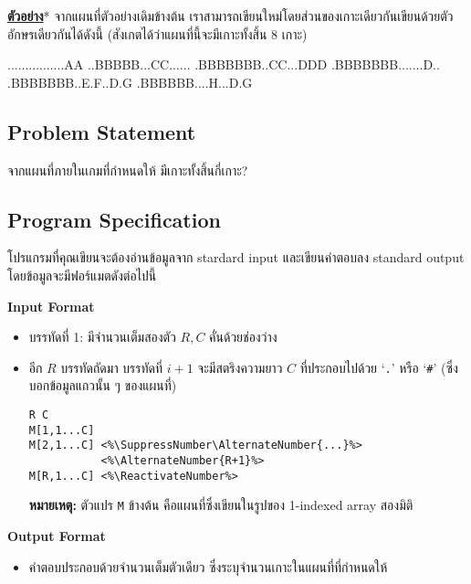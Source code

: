 \bigskip\noindent
\textbf{\uline{ตัวอย่าง}}* จากแผนที่ตัวอย่างเดิมข้างต้น 
เราสามารถเขียนใหม่โดยส่วนของเกาะเดียวกันเขียนด้วยตัวอักษรเดียวกันได้ดังนี้
(สังเกตได้ว่าแผนที่นี้จะมีเกาะทั้งสิ้น 8 เกาะ)
\begin{center}
    \vspace{0.25\baselineskip}
    \begin{centervrb}{18}
\begin{plainvrb}
................AA
..BBBBB...CC......
.BBBBBBB..CC...DDD
.BBBBBBB.......D..
.BBBBBBB..E.F..D.G
.BBBBBB....H...D.G
\end{plainvrb}
    \end{centervrb}
    \vspace{0.25\baselineskip}
\end{center}    

\subsection*{\sectionfont\upshape Problem Statement}

จากแผนที่ภายในเกมที่กำหนดให้ มีเกาะทั้งสิ้นกี่เกาะ?

\subsection*{\sectionfont\upshape Program Specification}

โปรแกรมที่คุณเขียนจะต้องอ่านข้อมูลจาก stardard input 
และเขียนคำตอบลง standard output โดยข้อมูลจะมีฟอร์แมตดังต่อไปนี้

\bigskip\noindent
{\sectionfont\bfseries Input Format}
\begin{itemize}[itemsep=0pt]
\item บรรทัดที่ 1: มีจำนวนเต็มสองตัว $R, C$ คั่นด้วยช่องว่าง
\item อีก $R$ บรรทัดถัดมา บรรทัดที่ $i+1$ จะมีสตริงความยาว $C$ 
    ที่ประกอบไปด้วย `\verb|.|' หรือ `\verb|#|' (ซึ่งบอกข้อมูลแถวนั้น ๆ ของแผนที่)
\begin{lstlisting}
R C
M[1,1...C]
M[2,1...C] <%\SuppressNumber\AlternateNumber{...}%>
           <%\AlternateNumber{R+1}%>
M[R,1...C] <%\ReactivateNumber%>
\end{lstlisting}
\textbf{หมายเหตุ:} ตัวแปร \verb|M| ข้างต้น คือแผนที่ซึ่งเขียนในรูปของ 1-indexed array สองมิติ
\end{itemize}

\medskip\noindent
{\sectionfont\bfseries Output Format}
\begin{itemize}
\item คำตอบประกอบด้วยจำนวนเต็มตัวเดียว ซึ่งระบุจำนวนเกาะในแผนที่ที่กำหนดให้
\end{itemize}

